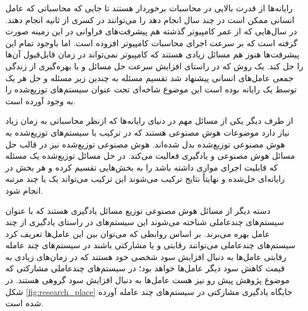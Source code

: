 رایانه‌ها از قدرت بالایی در محاسبات برخوردار هستند تا جایی که محاسباتی که عامل انسانی ممکن است در چند سال انجام دهد را می‌توانند در کسری از ثانیه انجام دهند. در سال‌هایی که از عمر کامپیوتر گذشته هم پیشرفت‌های فراوانی در این زمینه صورت گرفته است که بر سرعت اجرای محاسبات کامپیوتر افزوده است. اما باوجود تمام این پیشرفت‌ها هنوز هم مسائل زیادی هستند که کامپیوتر نمی‌تواند در زمان قابل‌قبول آن‌ها را حل کند. یک روش که در راستای افزایش سرعت حل مسائل و با بهره‌گیری از زندگی جمعی عامل‌های انسانی پیشنهاد شد تقسیم مسئله به چندین زیر مسئله و حل هر یک توسط یک رایانه بوده است این موضوع شاخه‌ای تحت عنوان سیستم‌های توزیع‌شده را به وجود آورده است.

از طرف دیگر یکی از مسائل مهم در دنیای رایانه‌ها که ازنظر محاسباتی به زمان زیاد نیاز دارد موضوعات هوش مصنوعی هستند که در ترکیب با سیستم‌های توزیع‌شده به هوش مصنوعی توزیع‌شده بدل شده‌اند. هوش مصنوعی توزیع‌شده نیز در قالب حل مسائل هوش مصنوعی و یادگیری فعالیت می‌کند. در حل مسائل توزیع‌شده یک مسئله که قابلیت اجرای موازی داشته باشد را به بخش‌هایی تقسیم کرده و هر بخش در رایانه‌ای حل‌شده و نهایتاً نتایج ترکیب می‌شوند این ترکیب می‌تواند یک یا چند مرتبه انجام شود.

دسته دیگر از مسائل هوش مصنوعی توزیع مسائل یادگیری هستند که با عنوان سیستم‌های چندعاملی شناخته می‌شوند این سیستم‌های در راستای یادگیری از چند عامل بهره می‌برند. بر اساس روابطی که می‌توان بین این عامل‌ها تعریف کرد سیستم‌های چندعاملی می‌توانند رقابتی و یا مشارکتی باشند در سیستم‌های چند عامله رقابتی عامل‌ها به دنبال افزایش سود شخصی خود هستند که در زمان‌های زیادی به قیمت کاهش سود دیگر عامل‌ها خواهد بود؛ در سیستم‌های چندعاملی مشارکتی که موضوع پژوهش پیش رو نیز هست عامل‌ها به دنبال افزایش سود گروهی هستند. در شکل
\ref{fig:research_place}
جایگاه یادگیری مشارکتی در سیستم‌های چند عامله آورده شده است.

